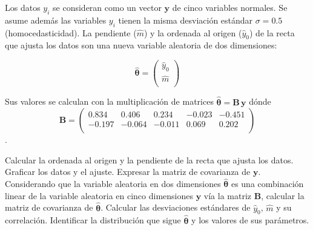 \documentclass[a4paper,11pt]{article}
\begin{document}
\begin{enumerate}
Los datos $y_i$ se consideran como un vector $\boldsymbol{y}$ de cinco variables normales. 
Se asume además las variables $y_i$ tienen la misma desviación estándar $\sigma = 0.5$ (homocedasticidad). 
La pendiente ($\hat{m}$) y la ordenada al origen ($\hat{y}_0$) de la recta que ajusta los datos son una nueva variable aleatoria de dos dimensiones: 

$$ \boldsymbol{\hat{\theta}} = 
\begin{pmatrix}
\hat{y}_0 \\
\hat{m} \\
\end{pmatrix} $$

Sus valores se calculan con la multiplicación de matrices $\boldsymbol{\hat{\theta}} = \mathbf{B} \, \boldsymbol{y}$ dónde
 $$
 \boldsymbol{B} = 
\begin{pmatrix}
0.834  &    0.406  &    0.234  &   -0.023  &   -0.451 \\
 -0.197  &    -0.064  &  -0.011 &    0.069  &    0.202 \\
 \end{pmatrix}
 $$.

Calcular la ordenada al origen y la pendiente de la recta que ajusta los datos. Graficar los datos y el ajuste.
Expresar la matriz de covarianza de $\boldsymbol{y}$. Considerando que la variable aleatoria en dos dimensiones $\boldsymbol{\hat{\theta}}$ es una combinación linear de la variable aleatoria en cinco dimensiones $\boldsymbol{y}$ vía la matriz $\boldsymbol{B}$, calcular la matriz de covarianza de $\boldsymbol{\hat{\theta}}$. Calcular las desviaciones estándares de  $\hat{y}_0$, $\hat{m}$ y su correlación. Identificar la distribución que sigue $\boldsymbol{\hat{\theta}}$ y los valores de sus parámetros. 
 




\end{enumerate}
\end{document}
